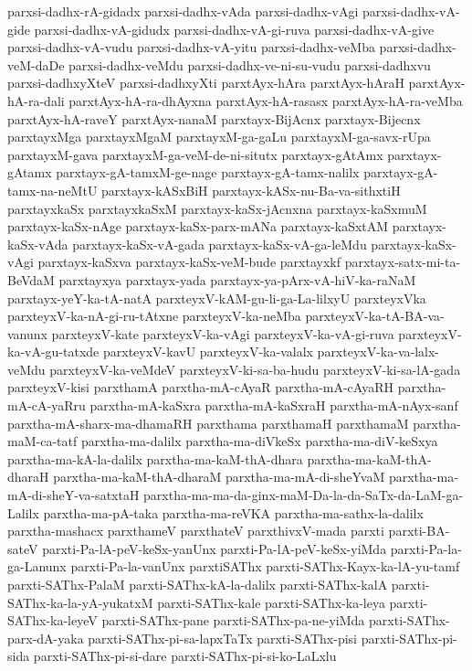 {parxsi-dadhx-rA-gidadx
parxsi-dadhx-vAda
parxsi-dadhx-vAgi
parxsi-dadhx-vA-gide
parxsi-dadhx-vA-gidudx
parxsi-dadhx-vA-gi-ruva
parxsi-dadhx-vA-give
parxsi-dadhx-vA-vudu
parxsi-dadhx-vA-yitu
parxsi-dadhx-veMba
parxsi-dadhx-veM-daDe
parxsi-dadhx-veMdu
parxsi-dadhx-ve-ni-su-vudu
parxsi-dadhxvu
parxsi-dadhxyXteV
parxsi-dadhxyXti
parxtAyx-hAra
parxtAyx-hAraH
parxtAyx-hA-ra-dali
parxtAyx-hA-ra-dhAyxna
parxtAyx-hA-rasasx
parxtAyx-hA-ra-veMba
parxtAyx-hA-raveY
parxtAyx-nanaM
parxtayx-BijAcnx
parxtayx-Bijecnx
parxtayxMga
parxtayxMgaM
parxtayxM-ga-gaLu
parxtayxM-ga-savx-rUpa
parxtayxM-gava
parxtayxM-ga-veM-de-ni-situtx
parxtayx-gAtAmx
parxtayx-gAtamx
parxtayx-gA-tamxM-ge-nage
parxtayx-gA-tamx-nalilx
parxtayx-gA-tamx-na-neMtU
parxtayx-kASxBiH
parxtayx-kASx-nu-Ba-va-sithxtiH
parxtayxkaSx
parxtayxkaSxM
parxtayx-kaSx-jAcnxna
parxtayx-kaSxmuM
parxtayx-kaSx-nAge
parxtayx-kaSx-parx-mANa
parxtayx-kaSxtAM
parxtayx-kaSx-vAda
parxtayx-kaSx-vA-gada
parxtayx-kaSx-vA-ga-leMdu
parxtayx-kaSx-vAgi
parxtayx-kaSxva
parxtayx-kaSx-veM-bude
parxtayxkf
parxtayx-satx-mi-ta-BeVdaM
parxtayxya
parxtayx-yada
parxtayx-ya-pArx-vA-hiV-ka-raNaM
parxtayx-yeY-ka-tA-natA
parxteyxV-kAM-gu-li-ga-La-lilxyU
parxteyxVka
parxteyxV-ka-nA-gi-ru-tAtxne
parxteyxV-ka-neMba
parxteyxV-ka-tA-BA-va-vanunx
parxteyxV-kate
parxteyxV-ka-vAgi
parxteyxV-ka-vA-gi-ruva
parxteyxV-ka-vA-gu-tatxde
parxteyxV-kavU
parxteyxV-ka-valalx
parxteyxV-ka-va-lalx-veMdu
parxteyxV-ka-veMdeV
parxteyxV-ki-sa-ba-hudu
parxteyxV-ki-sa-lA-gada
parxteyxV-kisi
parxthamA
parxtha-mA-cAyaR
parxtha-mA-cAyaRH
parxtha-mA-cA-yaRru
parxtha-mA-kaSxra
parxtha-mA-kaSxraH
parxtha-mA-nAyx-sanf
parxtha-mA-sharx-ma-dhamaRH
parxthama
parxthamaH
parxthamaM
parxtha-maM-ca-tatf
parxtha-ma-dalilx
parxtha-ma-diVkeSx
parxtha-ma-diV-keSxya
parxtha-ma-kA-la-dalilx
parxtha-ma-kaM-thA-dhara
parxtha-ma-kaM-thA-dharaH
parxtha-ma-kaM-thA-dharaM
parxtha-ma-mA-di-sheYvaM
parxtha-ma-mA-di-sheY-va-satxtaH
parxtha-ma-ma-da-ginx-maM-Da-la-da-SaTx-da-LaM-ga-Lalilx
parxtha-ma-pA-taka
parxtha-ma-reVKA
parxtha-ma-sathx-la-dalilx
parxtha-mashacx
parxthameV
parxthateV
parxthivxV-mada
parxti
parxti-BA-sateV
parxti-Pa-lA-peV-keSx-yanUnx
parxti-Pa-lA-peV-keSx-yiMda
parxti-Pa-la-ga-Lanunx
parxti-Pa-la-vanUnx
parxtiSAThx
parxti-SAThx-Kayx-ka-lA-yu-tamf
parxti-SAThx-PalaM
parxti-SAThx-kA-la-dalilx
parxti-SAThx-kalA
parxti-SAThx-ka-la-yA-yukatxM
parxti-SAThx-kale
parxti-SAThx-ka-leya
parxti-SAThx-ka-leyeV
parxti-SAThx-pane
parxti-SAThx-pa-ne-yiMda
parxti-SAThx-parx-dA-yaka
parxti-SAThx-pi-sa-lapxTaTx
parxti-SAThx-pisi
parxti-SAThx-pi-sida
parxti-SAThx-pi-si-dare
parxti-SAThx-pi-si-ko-LaLxlu
}
